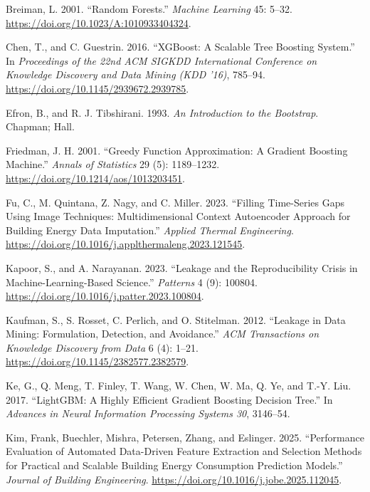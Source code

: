 \documentclass[
  10pt,
]{article}
\newlength{\cslhangindent}
\newlength{\cslentryspacingunit} %
\newenvironment{CSLReferences}[2] %
 {%
  \setlength{\parindent}{0pt}
  \ifodd #1
  \let\oldpar\par
  \def\par{\hangindent=\cslhangindent\oldpar}
  \fi
  \setlength{\parskip}{#2\cslentryspacingunit}
 }%
 {}
\begin{document}
\hypertarget{refs}{}
\begin{CSLReferences}{1}{0}
\leavevmode{}%
Breiman, L. 2001. {``Random Forests.''} \emph{Machine Learning} 45:
5--32. \url{https://doi.org/10.1023/A:1010933404324}.

\leavevmode{}%
Chen, T., and C. Guestrin. 2016. {``{XGBoost}: A Scalable Tree Boosting
System.''} In \emph{Proceedings of the 22nd ACM SIGKDD International
Conference on Knowledge Discovery and Data Mining (KDD '16)}, 785--94.
\url{https://doi.org/10.1145/2939672.2939785}.

\leavevmode{}%
Efron, B., and R. J. Tibshirani. 1993. \emph{An Introduction to the
Bootstrap}. Chapman; Hall.

\leavevmode{}%
Friedman, J. H. 2001. {``Greedy Function Approximation: A Gradient
Boosting Machine.''} \emph{Annals of Statistics} 29 (5): 1189--1232.
\url{https://doi.org/10.1214/aos/1013203451}.

\leavevmode{}%
Fu, C., M. Quintana, Z. Nagy, and C. Miller. 2023. {``Filling
Time-Series Gaps Using Image Techniques: Multidimensional Context
Autoencoder Approach for Building Energy Data Imputation.''}
\emph{Applied Thermal Engineering}.
\url{https://doi.org/10.1016/j.applthermaleng.2023.121545}.

\leavevmode{}%
Kapoor, S., and A. Narayanan. 2023. {``Leakage and the Reproducibility
Crisis in Machine-Learning-Based Science.''} \emph{Patterns} 4 (9):
100804. \url{https://doi.org/10.1016/j.patter.2023.100804}.

\leavevmode{}%
Kaufman, S., S. Rosset, C. Perlich, and O. Stitelman. 2012. {``Leakage
in Data Mining: Formulation, Detection, and Avoidance.''} \emph{ACM
Transactions on Knowledge Discovery from Data} 6 (4): 1--21.
\url{https://doi.org/10.1145/2382577.2382579}.

\leavevmode{}%
Ke, G., Q. Meng, T. Finley, T. Wang, W. Chen, W. Ma, Q. Ye, and T.-Y.
Liu. 2017. {``{LightGBM}: A Highly Efficient Gradient Boosting Decision
Tree.''} In \emph{Advances in Neural Information Processing Systems 30},
3146--54.

\leavevmode{}%
Kim, Frank, Buechler, Mishra, Petersen, Zhang, and Eslinger. 2025.
{``Performance Evaluation of Automated Data-Driven Feature Extraction
and Selection Methods for Practical and Scalable Building Energy
Consumption Prediction Models.''} \emph{Journal of Building
Engineering}. \url{https://doi.org/10.1016/j.jobe.2025.112045}.


\end{CSLReferences}
\end{document}
